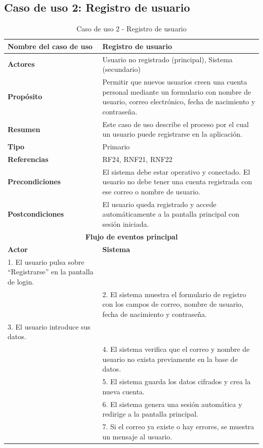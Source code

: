 \clearpage
\subsection{Caso de uso 2: Registro de usuario}

\begin{table}[H]
\centering
\caption{Caso de uso 2 - Registro de usuario}
\begin{tabular}{|p{4.5cm}|p{10.5cm}|}
\hline
\textbf{Nombre del caso de uso} & Registro de usuario \\
\hline
\textbf{Actores} & Usuario no registrado (principal), Sistema (secundario) \\
\hline
\textbf{Propósito} & Permitir que nuevos usuarios creen una cuenta personal mediante un formulario con nombre de usuario, correo electrónico, fecha de nacimiento y contraseña. \\
\hline
\textbf{Resumen} & Este caso de uso describe el proceso por el cual un usuario puede registrarse en la aplicación. \\
\hline
\textbf{Tipo} & Primario \\
\hline
\textbf{Referencias} & RF24, RNF21, RNF22 \\
\hline
\textbf{Precondiciones} & El sistema debe estar operativo y conectado. El usuario no debe tener una cuenta registrada con ese correo o nombre de usuario. \\
\hline
\textbf{Postcondiciones} & El usuario queda registrado y accede automáticamente a la pantalla principal con sesión iniciada. \\
\hline
\multicolumn{2}{|c|}{\textbf{Flujo de eventos principal}} \\
\hline
\textbf{Actor} & \textbf{Sistema} \\
\hline
1. El usuario pulsa sobre ``Registrarse'' en la pantalla de login. & \\
\hline
& 2. El sistema muestra el formulario de registro con los campos de correo, nombre de usuario, fecha de nacimiento y contraseña. \\
\hline
3. El usuario introduce sus datos. & \\
\hline
& 4. El sistema verifica que el correo y nombre de usuario no exista previamente en la base de datos. \\
\hline
& 5. El sistema guarda los datos cifrados y crea la nueva cuenta. \\
\hline
& 6. El sistema genera una sesión automática y redirige a la pantalla principal. \\
\hline
& 7. Si el correo ya existe o hay errores, se muestra un mensaje al usuario. \\
\hline
\end{tabular}
\end{table}

